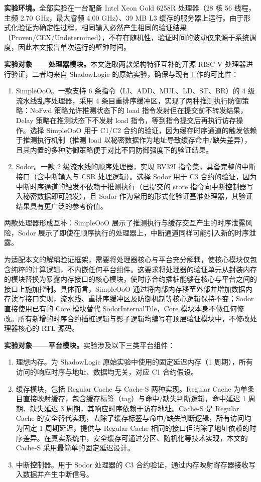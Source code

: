 \textbf{实验环境。}全部实验在一台配备 Intel Xeon Gold 6258R 处理器（28 核 56 线程，主频 2.70 GHz，最大睿频 4.00 GHz）、39 MB L3 缓存的服务器上运行。由于形式化验证为确定性过程，相同输入必然产生相同的验证结果（Proven/CEX/Undetermined），不存在随机性，验证时间的波动仅来源于系统调度，因此本文报告单次运行的壁钟时间。

\textbf{实验对象——处理器模块。}本文选取两款架构特征互补的开源 RISC-V 处理器进行验证，二者均来自 ShadowLogic 的原始实验，确保与现有工作的可比性：

\begin{enumerate}
    \item SimpleOoO。一款支持 6 条指令（LI、ADD、MUL、LD、ST、BR）的 4 级流水线乱序处理器，采用 4 条目重排序缓冲区，实现了两种推测执行防御策略：NoFwd 策略允许推测状态下的 load 指令发射但在提交前不转发结果，Delay 策略在推测状态下不发射 load 指令，等到指令提交后再执行访存操作。选择 SimpleOoO 用于 C1/C2 合约的验证，因为缓存时序通道的触发依赖于推测执行机制（推测 load 以秘密数据作为地址导致缓存命中/缺失差异），且其内置的多种防御策略便于对比不同防御强度下的验证结果。
    \item Sodor。一款 2 级流水线的顺序处理器，实现 RV32I 指令集，具备完整的中断接口（含中断输入与 CSR 处理逻辑）。选择 Sodor 用于 C3 合约的验证，因为中断时序通道的触发不依赖于推测执行（已提交的 store 指令向中断控制器写入秘密数据即可触发），且 Sodor 作为常用的形式化验证基准处理器，其验证结果具有更广泛的参考价值。
\end{enumerate}

两款处理器形成互补：SimpleOoO 展示了推测执行与缓存交互产生的时序泄露风险，Sodor 展示了即使在顺序执行的处理器上，中断通道同样可能引入新的时序泄露。

为适配本文的解耦验证框架，需要将处理器核心与平台充分解耦，使核心模块仅包含纯粹的计算逻辑，不内嵌任何平台组件。这要求将处理器的验证单元从封装内存的模块替换为暴露内存接口的核心模块，使时序合约插桩能够在核心与平台之间的接口上施加控制。具体而言，SimpleOoO 通过将内部内存移至外部并增加数据内存读写接口实现，流水线、重排序缓冲区及防御机制等核心逻辑保持不变；Sodor 直接使用已有的 Core 模块替代 SodorInternalTile，Core 模块本身不做任何修改。所有新增的时序合约插桩逻辑与影子逻辑均编写在顶层验证模块中，不修改处理器核心的 RTL 源码。

\textbf{实验对象——平台模块。}实验涉及以下三类平台组件：

\begin{enumerate}
    \item 理想内存。为 ShadowLogic 原始实验中使用的固定延迟内存（1 周期），所有访问的响应时序与地址、数据均无关，对应 C1 合约假设。
    \item 缓存模块，包括 Regular Cache 与 Cache-S 两种实现。Regular Cache 为单条目直接映射缓存，包含缓存标签（tag）与命中/缺失判断逻辑，命中延迟 1 周期、缺失延迟 3 周期，其响应时序依赖于访存地址。Cache-S 是 Regular Cache 的安全替代实现，去除了缓存标签与命中/缺失判断逻辑，所有访问均为固定 1 周期延迟，提供与 Regular Cache 相同的接口但消除了地址依赖的时序差异。在真实系统中，安全缓存可通过分区、随机化等技术实现，本文的 Cache-S 采用最简单的固定延迟设计。
    \item 中断控制器。用于 Sodor 处理器的 C3 合约验证，通过内存映射寄存器接收写入数据并产生中断信号。
\end{enumerate}

